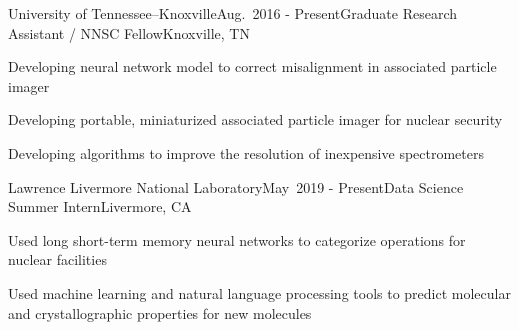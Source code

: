 
\begin{rSubsection}{University of Tennessee--Knoxville}{Aug.\ 2016 - Present}{Graduate Research Assistant / NNSC Fellow}{Knoxville, TN}
\item Developing neural network model to correct misalignment in associated particle imager
\item Developing portable, miniaturized associated particle imager for nuclear security
\item Developing algorithms to improve the resolution of inexpensive spectrometers
\end{rSubsection}


\begin{rSubsection}{Lawrence Livermore National Laboratory}{May\ 2019 - 
Present}{Data Science Summer Intern}{Livermore, CA}
\item Used long short-term memory neural networks to categorize operations for nuclear facilities
\item Used machine learning and natural language processing tools to predict molecular and crystallographic properties for new molecules
\end{rSubsection}



